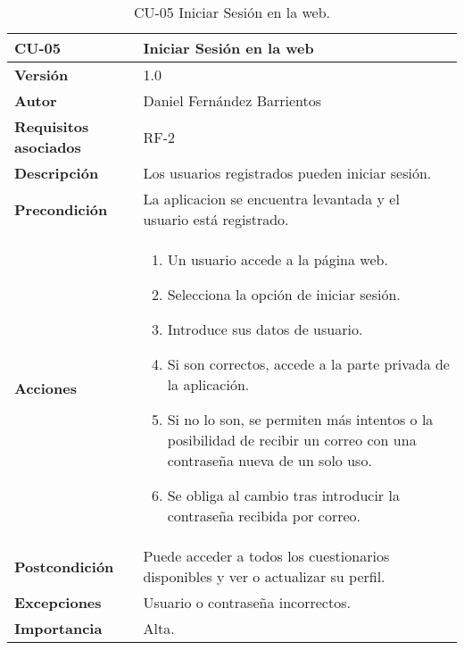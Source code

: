 \begin{table}[p]
	\centering
	\begin{tabularx}{\linewidth}{ p{} p{} }
		\toprule
		\textbf{CU-05}    & \textbf{Iniciar Sesión en la web}\\
		\toprule
		\textbf{Versión}              & 1.0    \\
		\textbf{Autor}                & Daniel Fernández Barrientos \\
		\textbf{Requisitos asociados} & RF-2 \\
		\textbf{Descripción}          & Los usuarios registrados pueden iniciar sesión. \\
		\textbf{Precondición}         & La aplicacion se encuentra levantada y el usuario está registrado. \\
		\textbf{Acciones}             &
		\begin{enumerate}
			\def\labelenumi{\arabic{enumi}.}
			\tightlist
			\item Un usuario accede a la página web.
			\item Selecciona la opción de iniciar sesión.
			\item Introduce sus datos de usuario.
			\item Si son correctos, accede a la parte privada de la aplicación.
			\item Si no lo son, se permiten más intentos o la posibilidad de recibir un correo con una contraseña nueva de un solo uso.
			\item Se obliga al cambio tras introducir la contraseña recibida por correo.
		\end{enumerate}\\
		\textbf{Postcondición}        & Puede acceder a todos los cuestionarios disponibles y ver o actualizar su perfil. \\
		\textbf{Excepciones}          & Usuario o contraseña incorrectos. \\
		\textbf{Importancia}          & Alta. \\
		\bottomrule
	\end{tabularx}
	\caption{CU-05 Iniciar Sesión en la web.}
\end{table}

